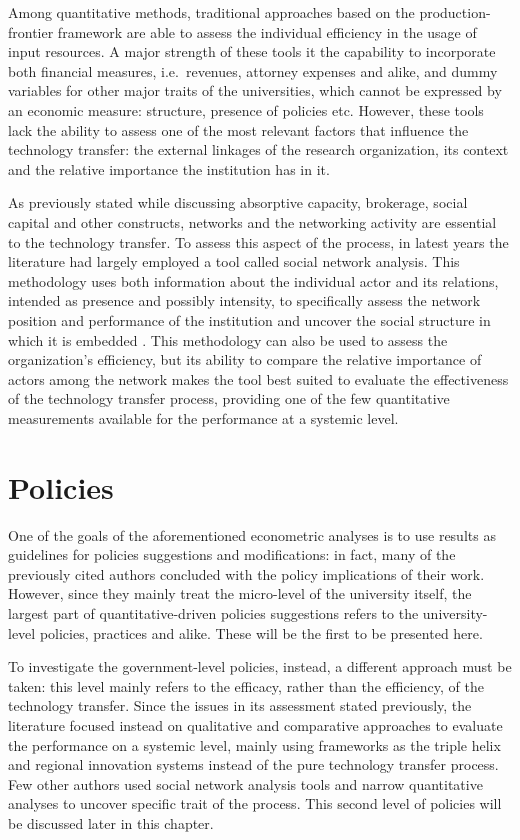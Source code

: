 Among quantitative methods, traditional approaches based on the production-frontier framework are able to assess the individual efficiency in the usage of input resources. A major strength of these tools it the capability to incorporate both financial measures, i.e.\ revenues, attorney expenses and alike, and dummy variables for other major traits of the universities, which cannot be expressed by an economic measure: structure, presence of policies etc. However, these tools lack the ability to assess one of the most relevant factors that influence the technology transfer: the external linkages of the research organization, its context and the relative importance the institution has in it. 

As previously stated while discussing absorptive capacity, brokerage, social capital and other constructs, networks and the networking activity are essential to the technology transfer. To assess this aspect of the process, in latest years the literature had largely employed a tool called social network analysis. This methodology uses both information about the individual actor and its relations, intended as presence and possibly intensity, to specifically assess the network position and performance of the institution and uncover the social structure in which it is embedded \citep{Pinheiro2015}. This methodology can also be used to assess the organization's efficiency, but its ability to compare the relative importance of actors among the network makes the tool best suited to evaluate the effectiveness of the technology transfer process, providing one of the few quantitative measurements available for the performance at a systemic level.

\section{Policies}

One of the goals of the aforementioned econometric analyses is to use results as guidelines for policies suggestions and modifications: in fact, many of the previously cited authors concluded with the policy implications of their work. However, since they mainly treat the micro-level of the university itself, the largest part of quantitative-driven policies suggestions refers to the university-level policies, practices and alike. These will be the first to be presented here.

To investigate the government-level policies, instead, a different approach must be taken: this level mainly refers to the efficacy, rather than the efficiency, of the technology transfer. Since the issues in its assessment stated previously, the literature focused instead on qualitative and comparative approaches to evaluate the performance on a systemic level, mainly using frameworks as the triple helix and regional innovation systems instead of the pure technology transfer process. Few other authors used social network analysis tools and narrow quantitative analyses to uncover specific trait of the process. This second level of policies will be discussed later in this chapter.

